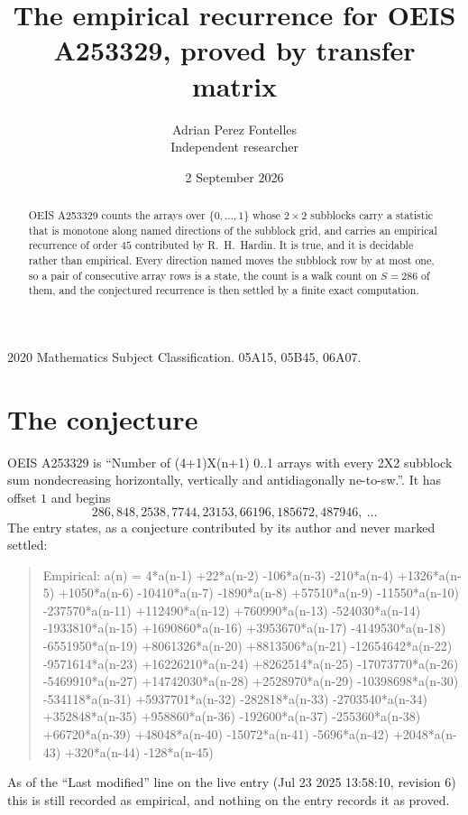 \documentclass[11pt,a4paper]{article}
\title{The empirical recurrence for OEIS A253329, proved by transfer matrix}
\author{Adrian Perez Fontelles\\ \small Independent researcher}
\date{2 September 2026}
\theoremstyle{plain}
\theoremstyle{definition}
\begin{document}
\maketitle

\begin{abstract}
OEIS A253329 counts the arrays over $\{0,\dots,1\}$ whose $2\times2$ subblocks carry a
statistic that is monotone along named directions of the subblock grid, and carries an
empirical recurrence of order $45$ contributed by R.~H.~Hardin. It is true, and it is
decidable rather than empirical. Every direction named moves the subblock row by at most one,
so a pair of consecutive array rows is a state, the count is a walk count on $S=286$ of them,
and the conjectured recurrence is then settled by a finite exact computation.
\end{abstract}

\noindent\small 2020 Mathematics Subject Classification. 05A15, 05B45, 06A07.\normalsize

\section{The conjecture}

OEIS A253329 is ``Number of (4+1)X(n+1) 0..1 arrays with every 2X2 subblock sum nondecreasing horizontally, vertically and antidiagonally ne-to-sw.''. It has offset $1$ and begins
\[
286, 848, 2538, 7744, 23153, 66196, 185672, 487946,\ \dots
\]
The entry states, as a conjecture contributed by its author and never marked settled:
\begin{quote}
Empirical: a(n) = 4*a(n-1) +22*a(n-2) -106*a(n-3) -210*a(n-4) +1326*a(n-5) +1050*a(n-6) -10410*a(n-7) -1890*a(n-8) +57510*a(n-9) -11550*a(n-10) -237570*a(n-11) +112490*a(n-12) +760990*a(n-13) -524030*a(n-14) -1933810*a(n-15) +1690860*a(n-16) +3953670*a(n-17) -4149530*a(n-18) -6551950*a(n-19) +8061326*a(n-20) +8813506*a(n-21) -12654642*a(n-22) -9571614*a(n-23) +16226210*a(n-24) +8262514*a(n-25) -17073770*a(n-26) -5469910*a(n-27) +14742030*a(n-28) +2528970*a(n-29) -10398698*a(n-30) -534118*a(n-31) +5937701*a(n-32) -282818*a(n-33) -2703540*a(n-34) +352848*a(n-35) +958860*a(n-36) -192600*a(n-37) -255360*a(n-38) +66720*a(n-39) +48048*a(n-40) -15072*a(n-41) -5696*a(n-42) +2048*a(n-43) +320*a(n-44) -128*a(n-45)
\end{quote}
As of the ``Last modified'' line on the live entry (Jul 23 2025 13:58:10, revision 6) this is still
recorded as empirical, and nothing on the entry records it as proved.
\end{document}

